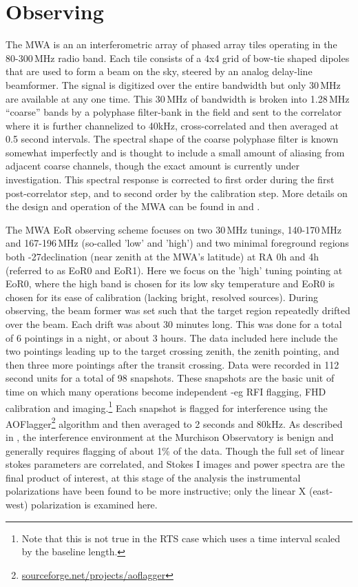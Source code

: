 \documentclass[preprint]{aastex}
\begin{document}
\section{Observing}
\label{sec:observing}
The MWA is an an interferometric array of phased array tiles operating in the 80-300\,MHz radio band. Each tile consists of a 4x4 grid of bow-tie shaped dipoles that are used to form a beam on the sky, steered by an analog delay-line beamformer.  The signal is digitized over the entire bandwidth but only 30\,MHz are available at any one time.  This 30\,MHz of bandwidth is broken into 1.28\,MHz ``coarse'' bands by a polyphase filter-bank in the field and sent to the correlator where it is further channelized to 40kHz, cross-correlated and then averaged at 0.5 second intervals. The spectral shape of the coarse polyphase filter is known somewhat imperfectly and is thought to include a small amount of aliasing from adjacent coarse channels, though the exact amount is currently under investigation. This spectral response is corrected to first order during the first post-correlator step, and to second order by the calibration step.  More details on the design and operation of the MWA can be found in \cite{Lonsdale:2009p7913} and \cite{Tingay:2013p9022}.

The MWA EoR observing scheme focuses on two 30\,MHz tunings, 140-170\,MHz and 167-196\,MHz (so-called 'low' and 'high') and two minimal foreground regions both -27\arcdeg declination (near zenith at the MWA's latitude) at RA 0h and 4h (referred to as EoR0 and EoR1). Here we focus on the 'high' tuning pointing at EoR0, where the high band is chosen for its low sky temperature and EoR0 is chosen for its ease of calibration (lacking bright, resolved sources). During observing, the beam former was set such that the target region repeatedly drifted over the beam.  Each drift was about 30 minutes long.  This was done for a total of 6 pointings in a night, or about 3 hours. The data included here include the two pointings leading up to the target crossing zenith, the zenith pointing, and then three more pointings after the transit crossing.  Data were recorded in 112 second units for a total of 98 snapshots. These snapshots are the basic unit of time on which many operations become independent -eg RFI flagging, FHD calibration and imaging.\footnote{Note that this is not true in the RTS case which uses a time interval scaled by the baseline length.}   Each snapshot is flagged for interference using the AOFlagger\footnote{\url{sourceforge.net/projects/aoflagger}} algorithm and then averaged to 2 seconds and 80kHz.  As described in \cite{2015PASA...32....8O}, the interference environment at the Murchison Observatory is benign and generally requires flagging of about 1\% of the data.   Though the full set of linear stokes parameters are correlated, and Stokes I images and power spectra are the final product of interest, at this stage of the analysis the instrumental polarizations have been found to be more instructive; only the linear X (east-west) polarization is examined here.  
\end{document}
